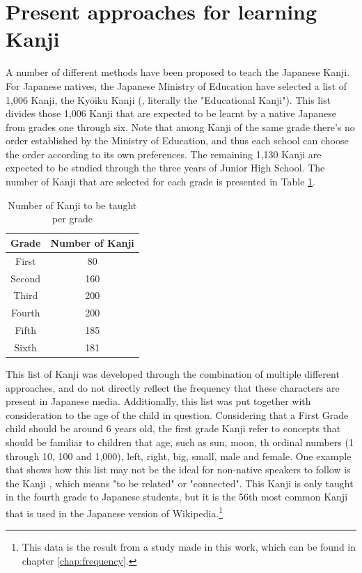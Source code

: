 \section{Present approaches for learning Kanji}\label{intro:presentapproaches}
A number of different methods have been proposed to teach the Japanese Kanji. For Japanese natives, the Japanese Ministry of Education have selected a list of 1,006 Kanji, the Ky\={o}iku Kanji (, literally the "Educational Kanji"). This list divides those 1,006 Kanji that are expected to be learnt by a native Japanese from grades one through six. Note that among Kanji of the same grade there's no order established by the Ministry of Education, and thus each school can choose the order according to its own preferences. The remaining 1,130 Kanji are expected to be studied through the three years of Junior High School. The number of Kanji that are selected for each grade is presented in Table \ref{tab:kyouiku}.

\begin{table}[ht]
\centering
\caption{Number of Kanji to be taught per grade}
\label{tab:kyouiku}
\begin{tabular}{|c|c|}
\hline
\textbf{Grade} & \textbf{Number of Kanji} \\ \hline
First & 80 \\ \hline
Second & 160 \\ \hline
Third & 200 \\ \hline
Fourth & 200 \\ \hline
Fifth & 185 \\ \hline
Sixth & 181 \\ \hline
\end{tabular}
\end{table}

This list of Kanji was developed through the combination of multiple different approaches, and do not directly reflect the frequency that these characters are present in Japanese media. Additionally, this list was put together with consideration to the age of the child in question. Considering that a First Grade child should be around 6 years old, the first grade Kanji refer to concepts that should be familiar to children that age, such as sun, moon, th ordinal numbers (1 through 10, 100 and 1,000), left, right, big, small, male and female. One example that shows how this list may not be the ideal for non-native speakers to follow is the Kanji , which means "to be related" or "connected". This Kanji is only taught in the fourth grade to Japanese students, but it is the 56th most common Kanji that is used in the Japanese version of Wikipedia.\footnote{This data is the result from a study made in this work, which can be found in chapter \ref{chap:frequency}.}

